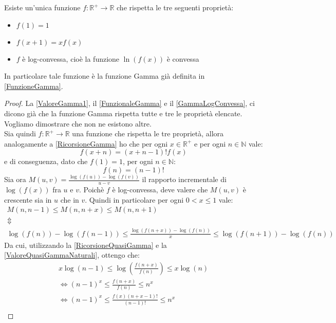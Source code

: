 \begin{theorem} \label{BohrMollerup}
	Esiste un'unica funzione $f :\mathbb{R}^{+}\to\mathbb{R} $ che rispetta le tre seguenti proprietà:
	\begin{itemize}
		\item $f(1)=1$
		\item $f(x+1)=xf(x)$
		\item $f$ è log-convessa, cioè la funzione $\ln(f(x))$ è convessa
	\end{itemize}
	In particolare tale funzione è la funzione Gamma già definita in \cref{FunzioneGamma}.
\end{theorem}
\begin{proof}
	La \cref{ValoreGamma1}, il \cref{FunzionaleGamma} e il \cref{GammaLogConvessa}, ci dicono già che la funzione
	Gamma rispetta tutte e tre le proprietà elencate. Vogliamo dimostrare che non ne esistono altre.\\
	Sia quindi $f:\mathbb{R^+}\to\mathbb{R}$ una funzione che rispetta le tre proprietà, allora analogamente a 
	\cref{RicorsioneGamma} ho che per ogni $x\in \mathbb{R^+}$ e per ogni $n\in\mathbb{N}$ vale:
	\begin{equation}\label{RicorsioneQuasiGamma}
		f(x+n)=(x+n-1)!f(x)
	\end{equation}
	e di conseguenza, dato che $f(1)=1$, per ogni $n\in\mathbb{N}$:
	\begin{equation}\label{ValoreQuasiGammaNaturali}
		f(n)=(n-1)!
	\end{equation}
	Sia ora $M(u,v)=\frac{\log(f(u))-\log(f(v))}{u-v}$ il rapporto incrementale
	di $\log(f(x))$ fra $u$ e $v$. Poichè $f$ è log-convessa, deve valere che $M(u,v)$ è crescente sia in $u$ che in $v$.
	Quindi in particolare per ogni $0<x\le 1$ vale:
	\begin{gather*}
		M(n,n-1) \le M(n,n+x) \le M(n,n+1) \\
		\Updownarrow \\
		\log(f(n))-\log(f(n-1)) \le \frac{\log(f(n+x))-\log(f(n))}{x} \le \log(f(n+1))-\log(f(n)) 
	\end{gather*}
	Da cui, utilizzando la \cref{RicorsioneQuasiGamma} e la \cref{ValoreQuasiGammaNaturali}, ottengo che:
	\begin{gather*}
		x \log(n-1) \le \log \left( \frac{f(n+x)}{f(n)} \right) \le x\log(n)\\
		\iff (n-1)^x \le \frac{f(n+x)}{f(n)} \le n^x \\
		\iff (n-1)^x \le  \frac{f(x)(n+x-1)!}{(n-1)!}  \le n^x \\

\end{gather*}
\end{proof}
